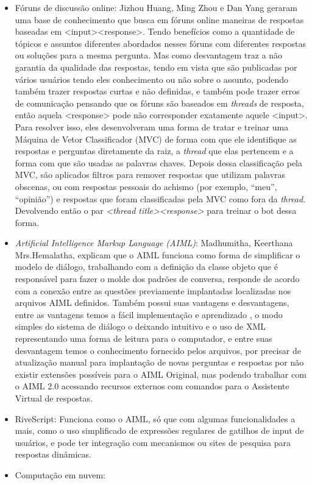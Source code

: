\documentclass[
	12pt,				%
	oneside,
	a4paper,			%
	english,			%
	french,				%
	spanish,			%
	brazil				%
	]{abntex2}
\begin{document}
\begin{itemize}
	\item Fóruns de discussão online: Jizhou Huang, Ming Zhou e Dan Yang geraram uma base de conhecimento que busca em fóruns online maneiras de respostas baseadas em <input><response>. Tendo benefícios como a quantidade de tópicos e assuntos diferentes abordados nesses fóruns com diferentes respostas ou soluções para a mesma pergunta. Mas como desvantagem traz a não garantia da qualidade das respostas, tendo em vista que são publicadas por vários usuários tendo eles conhecimento ou não sobre o assunto, podendo também trazer respostas curtas e não definidas, e também pode trazer erros de comunicação pensando que os fóruns são baseados em \emph{threads} de resposta, então aquela <response> pode não corresponder exatamente aquele <input>. Para resolver isso, eles desenvolveram uma forma de tratar e treinar uma Máquina de Vetor Classificador (MVC) de forma com que ele identifique as respostas e perguntas diretamente da raiz, a \emph{thread} que elas pertencem e a forma com que são usadas as palavras chaves. Depois dessa classificação pela MVC, são aplicados filtros para remover respostas que utilizam palavras obscenas, ou com respostas pessoais do achismo (por exemplo, “meu”, “opinião”) e respostas que foram classificadas pela MVC como fora da \emph{thread}. Devolvendo então o par \emph{<thread title><response>} para treinar o bot dessa forma.

	\item \emph{Artificial Intelligence Markup Language (AIML)}: Madhumitha, Keerthana Mrs.Hemalatha, explicam que o AIML funciona como forma de simplificar o modelo de diálogo, trabalhando com a definição da classe objeto que é responsável para fazer o molde dos padrões de conversa, responde de acordo com a conexão entre as questões previamente implantadas localizadas nos arquivos AIML definidos. Também possui suas vantagens e desvantagens, entre as vantagens temos a fácil implementação e aprendizado , o modo simples do sistema de diálogo o deixando intuitivo e o uso de XML representando uma forma de leitura para o computador, e entre suas desvantagem temos o conhecimento fornecido pelos arquivos, por precisar de atualização manual para implantação de novas perguntas e respostas por não existir extensões possíveis para o AIML Original, mas podendo trabalhar com o AIML 2.0 acessando recursos externos com comandos para o Assistente Virtual de respostas.
	\item RiveScript: Funciona como o AIML, só que com algumas funcionalidades a mais, como o uso simplificado de expressões regulares de gatilhos de input de usuários, e pode ter integração com mecanismos ou sites de pesquisa para respostas dinâmicas.
	\item Computação em nuvem:
\end{itemize} 
\end{document}

